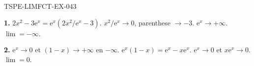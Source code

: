\begin{corrige}{TSPE-LIMFCT-EX-043}

\textbf{1.} $2x^2 - 3\mathrm{e}^x = \mathrm{e}^x(2x^2/\mathrm{e}^x - 3)$. $x^2/\mathrm{e}^x \to 0$, parenthese $\to -3$. $\mathrm{e}^x \to +\infty$. $\boxed{\lim = -\infty}$.

\textbf{2.} $\mathrm{e}^x \to 0$ et $(1-x) \to +\infty$ en $-\infty$. $\mathrm{e}^x(1-x) = \mathrm{e}^x - x\mathrm{e}^x$. $\mathrm{e}^x \to 0$ et $x\mathrm{e}^x \to 0$. $\boxed{\lim = 0}$.

\end{corrige}
